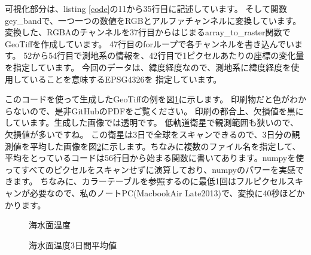 可視化部分は、listing \ref{code}の11から35行目に記述しています。
そして関数gey\_bandで、一つ一つの数値をRGBとアルファチャンネルに変換しています。
変換した、RGBAのチャンネルを37行目からはじまるarray\_to\_raster関数でGeoTiffを作成しています。
47行目のforループで各チャンネルを書き込んでいます。
52から54行目で測地系の情報を、42行目で1ピクセルあたりの座標の変化量を指定しています。
今回のデータは、緯度経度なので、測地系に緯度経度を使用していることを意味するEPSG4326を
指定しています。

このコードを使って生成したGeoTiffの例を図\ref{fig:sst}に示します。
印刷物だと色がわからないので、是非GitHubのPDFをご覧ください。
印刷の都合上、欠損値を黒にしています。生成した画像では透明です。
低軌道衛星で観測範囲も狭いので、欠損値が多いですね。
この衛星は3日で全球をスキャンできるので、3日分の観測値を平均した画像を図\ref{fig:sst-ave}に示します。ちなみに複数のファイル名を指定して、平均をとっているコードは56行目から始まる関数に書いてあります。numpyを使ってすべてのピクセルをスキャンせずに演算しており、numpyのパワーを実感できます。
ちなみに、カラーテーブルを参照するのに最低1回はフルピクセルスキャンが必要なので、私のノートPC(MacbookAir Late2013)で、変換に40秒ほどかかります。


\begin{figure}[t]
\centering
{}
\caption{海水面温度}
\label{fig:sst}
\end{figure}

\begin{figure}[t]
\centering
{}
\caption{海水面温度3日間平均値}
\label{fig:sst-ave}
\end{figure}

\clearpage


